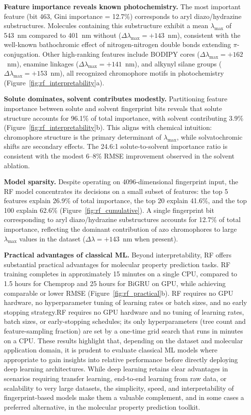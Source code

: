 \documentclass[journal=jcisd8,manuscript=article]{achemso}
\newcommand{\addedii}[1]{{\color{addedgreen}#1}}
\newcommand{\removedii}[1]{{\color{removedorange}#1}}
\begin{document}
\textbf{Feature importance reveals known photochemistry.}
The most important feature (bit 463, Gini importance = 12.7\%) corresponds to aryl diazo/hydrazine substructures.
Molecules containing this substructure exhibit a mean $\lambda_{\max}$ of 543~nm compared to 401~nm without ($\Delta\lambda_{\max} = +143$~nm), consistent with the well-known bathochromic effect of nitrogen-nitrogen double bonds extending $\pi$-conjugation.
Other high-ranking features include BODIPY cores ($\Delta\lambda_{\max} = +162$~nm), enamine linkages ($\Delta\lambda_{\max} = +141$~nm), and alkynyl silane groups ($\Delta\lambda_{\max} = +153$~nm), all recognized chromophore motifs in photochemistry (Figure~\ref{fig:rf_interpretability}a).

\textbf{Solute dominates, solvent contributes modestly.}
Partitioning feature importance between solute and solvent fingerprint bits reveals that solute structure accounts for 96.1\% of total importance, with solvent contributing 3.9\% (Figure~\ref{fig:rf_interpretability}b).
This aligns with chemical intuition: chromophore structure is the primary determinant of $\lambda_{\max}$, while solvatochromic shifts are secondary effects.
The 24.6:1 solute-to-solvent importance ratio is consistent with the modest 6--8\% RMSE improvement observed in the solvent ablation.

\textbf{Model sparsity.}
Despite operating on 4096-dimensional fingerprint input, the RF model concentrates its decisions on a small subset of features: the top 5 features explain 26.9\% of total importance, the top 20 explain 41.6\%, and the top 100 explain 62.6\% (Figure~\ref{fig:rf_cumulative}).
A single fingerprint bit corresponding to aryl diazo/hydrazine substructures accounts for 12.7\% of total importance, reflecting the dominant contribution of azo chromophores to large $\lambda_{\max}$ values in the dataset ($\Delta\lambda = +143$~nm when present).

\textbf{Practical advantages of classical ML.}
Beyond interpretability, RF offers substantial practical advantages for molecular property prediction tasks.
RF training completes in approximately 15 minutes on a single CPU, compared to 1.5 hours for Chemprop and 25 hours for BiGRU on GPU, while achieving comparable or lower RMSE (Figure~\ref{fig:rf_practical}b).
\removedii{RF requires no GPU hardware, no hyperparameter tuning of learning rates or batch sizes, and no early stopping strategy.}\addedii{RF requires no GPU hardware and no tuning of learning rates, batch sizes, or early-stopping schedules; its only hyperparameters (tree count and feature-sampling fraction) are set by a one-time grid search that runs in minutes on a CPU.}
These results highlight that, depending on the dataset and molecular application domain, it is prudent to evaluate classical ML models where appropriate to gain insights into relative performance before directly deploying deep learning architectures.
While deep learning retains clear advantages in scenarios requiring transfer learning, end-to-end learning from raw data, or scalability to very large datasets, the simplicity, speed, and interpretability of fingerprint-based models make them a valuable complement, and in some cases a preferred alternative, in the molecular property prediction toolkit.
\end{document}

